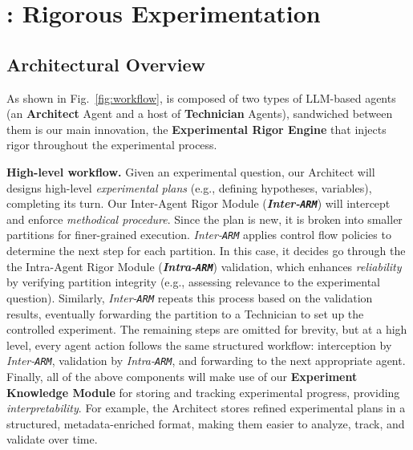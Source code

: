 \section{\sys: Rigorous Experimentation}
\label{sec:curie}
\subsection{Architectural Overview} 

As shown in Fig.~\ref{fig:workflow}, \sys is composed of two types of LLM-based agents (an \textbf{Architect} Agent and a host of \textbf{Technician} Agents), 
sandwiched between them is our main innovation, the \textbf{Experimental Rigor Engine} that injects rigor throughout the experimental process. 

\noindent\textbf{High-level workflow.} Given an experimental question, our Architect will  designs high-level \textit{experimental plans} (e.g., defining hypotheses, variables), completing its turn. Our Inter-Agent Rigor Module (\textbf{\textit{Inter-\texttt{ARM}}}) will  intercept and enforce \textit{methodical procedure}. Since the plan is new, it is broken into smaller partitions for finer-grained execution. 
\textit{Inter-\texttt{ARM}} applies control flow policies to determine the next step for each partition. 
In this case, it decides go through the  the Intra-Agent Rigor Module (\textbf{\textit{Intra-\texttt{ARM}}}) validation, which enhances \textit{reliability} by verifying partition integrity (e.g., assessing relevance to the experimental question).
Similarly, \textit{Inter-\texttt{ARM}} repeats this process based on the validation results, eventually  forwarding the partition to a Technician to  set up the controlled experiment. 
The remaining steps are omitted for brevity, but at a high level, every agent action follows the same structured workflow:  interception by \textit{Inter-\texttt{ARM}},  validation by \textit{Intra-\texttt{ARM}}, and  forwarding to the next appropriate agent. 
Finally, all of the above components will make use of our \textbf{Experiment Knowledge Module} for storing and tracking experimental progress, providing \textit{interpretability}. 
For example, the Architect stores refined experimental plans in a structured, metadata-enriched format, making them easier to analyze, track, and validate over time.

